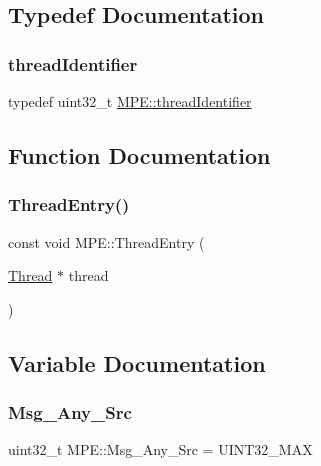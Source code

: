 \subsection{Typedef Documentation}
\mbox{\label{namespace_m_p_e_a16447295e3105bd2ba2a9ea303566175}} 
\subsubsection{\texorpdfstring{thread\+Identifier}{threadIdentifier}}
{\footnotesize\ttfamily typedef uint32\+\_\+t \hyperlink{namespace_m_p_e_a16447295e3105bd2ba2a9ea303566175}{M\+P\+E\+::thread\+Identifier}}



\subsection{Function Documentation}
\mbox{\label{namespace_m_p_e_a9485a8e81a058e9f485fa13c60c6d1ef}} 
\subsubsection{\texorpdfstring{Thread\+Entry()}{ThreadEntry()}}
{\footnotesize\ttfamily const void M\+P\+E\+::\+Thread\+Entry (\begin{DoxyParamCaption}\item[{\hyperlink{class_m_p_e_1_1_thread}{Thread} $\ast$}]{thread }\end{DoxyParamCaption})}



\subsection{Variable Documentation}
\mbox{\label{namespace_m_p_e_a0a698f47d1ab10c44a414685c36494f1}} 
\subsubsection{\texorpdfstring{Msg\+\_\+\+Any\+\_\+\+Src}{Msg\_Any\_Src}}
{\footnotesize\ttfamily uint32\+\_\+t M\+P\+E\+::\+Msg\+\_\+\+Any\+\_\+\+Src = U\+I\+N\+T32\+\_\+\+M\+AX\hspace{0.3cm}{\ttfamily [static]}}

